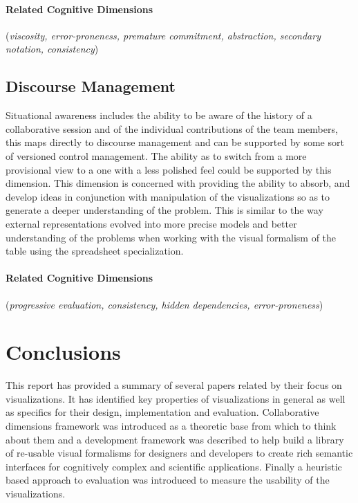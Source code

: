 \documentclass{sig-alternate}
\begin{document}
\paragraph{Related Cognitive Dimensions}
(\emph{viscosity, error-proneness, premature commitment, abstraction, secondary
notation, consistency})

\subsection{Discourse Management}
Situational awareness includes the ability to be aware of the history of a
collaborative session and of the individual contributions of the team members,
this maps directly to discourse management and can be supported by some sort of
versioned control management. The ability as to switch from a more provisional
view to a one with a less polished feel could be supported by this dimension.
This dimension is concerned with providing the ability to  absorb, and develop
ideas in conjunction with manipulation of the visualizations so as to generate a
deeper understanding of the problem. This is similar to the way external
representations evolved into more precise models and better understanding of the
problems when working with the visual formalism of the table using the
spreadsheet specialization.

\paragraph{Related Cognitive Dimensions}
(\emph{progressive evaluation, consistency, hidden dependencies, error-proneness})

\section{Conclusions}
This  report has provided a summary of several papers related by their focus on
visualizations. It has identified key properties of visualizations in general as
well as specifics for their design, implementation and evaluation. Collaborative
dimensions framework was introduced as a theoretic base from which to think
about them and a development framework was described to help build a library of
re-usable visual formalisms for designers and developers to create rich semantic
interfaces for cognitively complex and scientific applications. Finally a
heuristic based approach to evaluation was introduced to measure the usability
of the visualizations.
\end{document}
